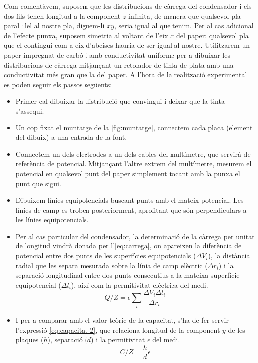Com comentàvem, suposem que les distribucions de càrrega del condensador i els dos fils tenen longitud a la component $z$ infinita, de manera que qualsevol pla paral·lel al nostre pla, diguem-li $xy$, seria igual al que tenim. Per al cas adicional de l'efecte punxa, suposem simetria al voltant de l'eix $x$ del paper: qualsevol pla que el contingui com a eix d'abcises hauria de ser igual al nostre. Utilitzarem un paper impregnat de carbó i amb conductivitat uniforme per a dibuixar les distribucions de càrrega mitjançant un retolador de tinta de plata amb una conductivitat més gran que la del paper. A l'hora de la realització experimental es poden seguir els passos següents:
\begin{itemize}
	\item Primer cal dibuixar la distribució que convingui i deixar que la tinta s'assequi.
	\item Un cop fixat el muntatge de la \cref{fig:muntatge}, connectem cada placa (element del dibuix) a una entrada de la font.
	\item Connectem un dels electrodes a un dels cables del multímetre, que servirà de referència de potencial. Mitjançant l'altre extrem del multímetre, mesurem el potencial en qualsevol punt del paper simplement tocant amb la punxa el punt que sigui.
	\item Dibuixem línies equipotencials buscant punts amb el mateix potencial. Les línies de camp es troben posteriorment, aprofitant que són perpendiculars a les línies equipotencials.
	\item Per al cas particular del condensador, la determinació de la càrrega per unitat de longitud vindrà donada per l'\cref{eq:carrega}, on apareixen la diferència de potencial entre dos punts de les superfícies equipotencials ($\Delta V_i$), la distància radial que les separa mesurada sobre la línia de camp elèctric
		($\Delta r_i$) i la separació longitudinal entre dos punts consecutius a la mateixa superfície equipotencial ($\Delta l_i$), així com la permitivitat elèctrica del medi.
		\begin{equation}\label{eq:carrega}
			Q/Z=\epsilon \sum_i \frac{\Delta V_i \Delta l_i}{\Delta r_i}
		\end{equation}
	\item I per a comparar amb el valor teòric de la capacitat, s'ha de fer servir l'expressió \cref{eq:capacitat 2}, que relaciona longitud de la component $y$ de les plaques ($h$), separació ($d$) i la permitivitat  $\epsilon$ del medi.
		\begin{equation}\label{eq:capacitat 2} 
			C/Z=\frac{h}{d}\epsilon
		\end{equation}
\end{itemize}

